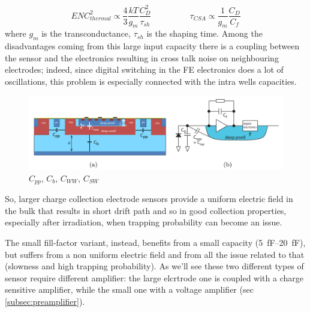       \begin{equation}
         ENC^2 _ {thermal} \propto \frac{4}{3}\frac{kT}{g_m}\frac{C_D ^2}{\tau_{sh}}
         \hspace{55pt}
         \tau_{CSA} \propto \frac{1}{g_m}\frac{C_D}{C_f}
      \end{equation}
      where $g_m$ is the transconductance, $\tau_{sh}$ is the shaping time. 
      Among the disadvantages coming from this large input capacity there is a coupling between the sensor and the electronics resulting in cross talk noise on neighbouring electrodes; indeed, since digital switching in the FE electronics does a lot of oscillations, this problem is especially connected with the intra wells capacities.
      \begin{figure}[h!]
         \centering\includegraphics[width=12cm]{figures/Pixel_detectors/DMAPS_capacity.png}
         \caption{$C_{pp}$, $C_{b}$, $C_{WW}$, $C_{SW}$}
         \label{fig:DMAPS_capacity}
      \end{figure}
      So, larger charge collection electrode sensors provide a uniform electric field in the bulk that results in short drift path and so in good collection properties, especially after irradiation, when trapping probability can become an issue.

      The small fill-factor variant, instead, benefits from a small capacity (\SIrange{5}{20}{fF}), but suffers from a non uniform electric field and from all the issue related to that (slowness and high trapping probability). 
      As we'll see these two different types of sensor require different amplifier: the large elcrtrode one is coupled with a charge sensitive amplifier, while the small one with a voltage amplifier (sec \ref{subsec:preamplifier}).

